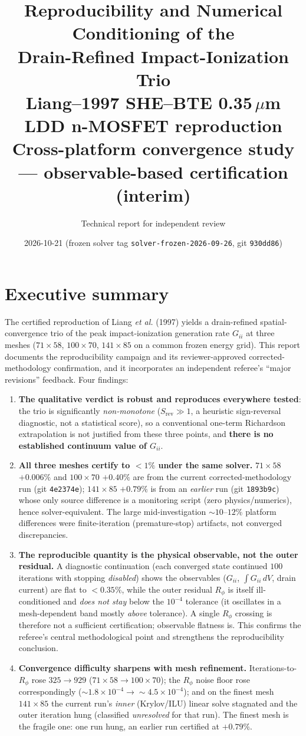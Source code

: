 \documentclass[11pt]{article}
\title{\textbf{Reproducibility and Numerical Conditioning of the\\ Drain-Refined Impact-Ionization Trio}\\[2pt]
\large Liang--1997 SHE--BTE 0.35\,$\mu$m LDD n-MOSFET reproduction\\[2pt]
\normalsize Cross-platform convergence study --- observable-based certification (interim)}
\author{Technical report for independent review}
\date{2026-10-21 \quad(frozen solver tag \texttt{solver-frozen-2026-09-26}, git \texttt{930dd86})}
\newcommand{\ten}[1]{\times 10^{#1}}
\begin{document}
\maketitle

\section*{Executive summary}
The certified reproduction of Liang \emph{et al.} (1997) yields a drain-refined spatial-convergence trio of the peak impact-ionization generation rate $G_{ii}$ at three meshes ($71\times58$, $100\times70$, $141\times85$ on a common frozen energy grid). This report documents the reproducibility campaign and its reviewer-approved corrected-methodology confirmation, and it incorporates an independent referee's ``major revisions'' feedback. Four findings:

\begin{enumerate}[nosep]
\item \textbf{The qualitative verdict is robust and reproduces everywhere tested}: the trio is significantly \emph{non-monotone} ($S_{\mathrm{rev}}\gg1$, a heuristic sign-reversal diagnostic, not a statistical score), so a conventional one-term Richardson extrapolation is not justified from these three points, and \textbf{there is no established continuum value of $G_{ii}$}.
\item \textbf{All three meshes certify to $<\!1\%$ under the same solver.} $71\times58$ $+0.006\%$ and $100\times70$ $+0.40\%$ are from the current corrected-methodology run (git \texttt{4e2374e}); $141\times85$ $+0.79\%$ is from an \emph{earlier} run (git \texttt{1893b9c}) whose only source difference is a monitoring script (zero physics/numerics), hence solver-equivalent. The large mid-investigation $\sim\!10$--$12\%$ platform differences were finite-iteration (premature-stop) artifacts, not converged discrepancies.
\item \textbf{The reproducible quantity is the physical observable, not the outer residual.} A diagnostic continuation (each converged state continued $100$ iterations with stopping \emph{disabled}) shows the observables ($G_{ii}$, $\int G_{ii}\,dV$, drain current) are flat to $<\!0.35\%$, while the outer residual $R_\phi$ is itself ill-conditioned and \emph{does not stay} below the $10^{-4}$ tolerance (it oscillates in a mesh-dependent band mostly \emph{above} tolerance). A single $R_\phi$ crossing is therefore not a sufficient certification; observable flatness is. This confirms the referee's central methodological point and strengthens the reproducibility conclusion.
\item \textbf{Convergence difficulty sharpens with mesh refinement.} Iterations-to-$R_\phi$ rose $325\to929$ ($71\times58\to100\times70$); the $R_\phi$ noise floor rose correspondingly ($\sim\!1.8\ten{-4}\to\sim\!4.5\ten{-4}$); and on the finest mesh $141\times85$ the current run's \emph{inner} (Krylov/ILU) linear solve stagnated and the outer iteration hung (classified \emph{unresolved} for that run). The finest mesh is the fragile one: one run hung, an earlier run certified at $+0.79\%$.
\end{enumerate}
\end{document}
